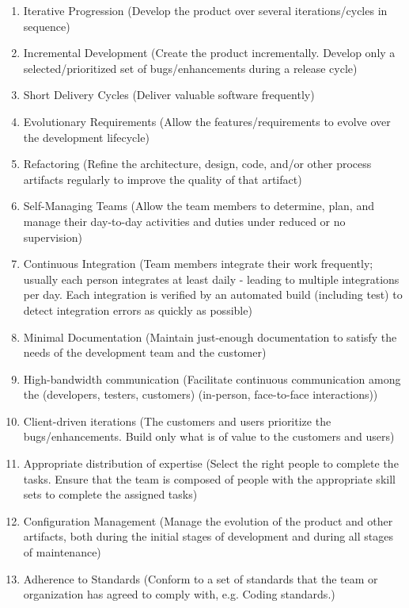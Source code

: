 \begin{appendices}
\begin{enumerate}
	\item Iterative Progression {\footnotesize (Develop the product over several iterations/cycles in sequence)}
	\item Incremental Development {\footnotesize (Create the product incrementally. Develop only a selected/prioritized set of bugs/enhancements during a release cycle)}
	\item Short Delivery Cycles {\footnotesize (Deliver valuable software frequently)}
	\item Evolutionary Requirements {\footnotesize (Allow the features/requirements to evolve over the development lifecycle)}
	\item Refactoring {\footnotesize (Refine the architecture, design, code, and/or other process artifacts regularly to improve the quality of that artifact)}
	\item Self-Managing Teams {\footnotesize(Allow the team members to determine, plan, and manage their day-to-day activities and duties under reduced or no supervision)}
	\item Continuous Integration {\footnotesize(Team members integrate their work frequently; usually each person integrates at least daily - leading to multiple integrations per day. Each integration is verified by an automated build (including test) to detect integration errors as quickly as possible)}
	\item Minimal Documentation {\footnotesize (Maintain just-enough documentation to satisfy the needs of the development team and the customer)}
	\item High-bandwidth communication {(Facilitate continuous communication among the (developers, testers, customers) (in-person, face-to-face interactions))}
	\item Client-driven iterations {\footnotesize (The customers and users prioritize the bugs/enhancements. Build only what is of value to the customers and users)} 
	\item Appropriate distribution of expertise {\footnotesize (Select the right people to complete the tasks. Ensure that the team is composed of people with the appropriate skill sets to complete the assigned tasks)}
	\item Configuration Management {\footnotesize (Manage the evolution of the product and other artifacts, both during the initial stages of development and during all stages of maintenance)}
	\item Adherence to Standards {\footnotesize (Conform to a set of standards that the team or organization has agreed to comply with,  e.g. Coding standards.)}	
\end{enumerate}




\end{appendices}
